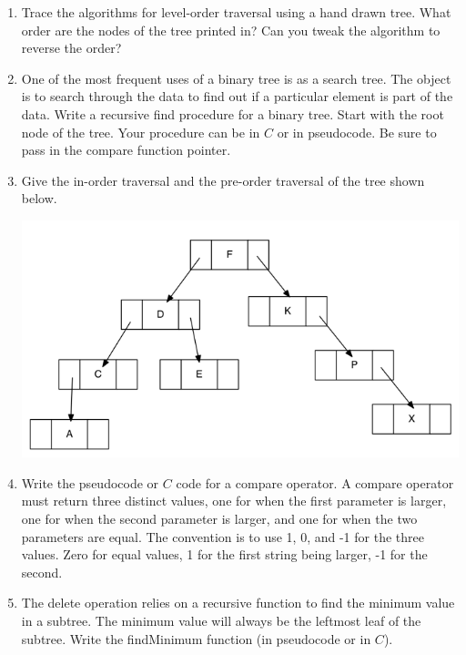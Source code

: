 \documentclass{article}
\begin{document}
\begin{enumerate}
	\vspace{1.5cm}
	\item Trace the algorithms for level-order traversal using a hand drawn tree. What order are the nodes of the tree printed in? Can you tweak the algorithm to reverse the order?
	\vspace{6cm}
	\item One of the most frequent uses of a binary tree is as a search tree. The object is to search through the data to find out if a particular element is part of the data. Write a recursive find procedure for a binary tree. Start with the root node of the tree. Your procedure can be in \(C\) or in pseudocode. Be sure to pass in the compare function pointer.
	\vspace{6cm}
	\item Give the in-order traversal and the pre-order traversal of the tree shown below.
		\begin{center}
			\includegraphics[scale=0.5]{alphatree}
		\end{center}
	\vspace{2cm}
	\item Write the pseudocode or \(C\) code for a compare operator. A compare operator must return three distinct values, one for when the first parameter is larger, one for when the second parameter is larger, and one for when the two parameters are equal. The convention is to use 1, 0, and -1 for the three values. Zero for equal values, 1 for the first string being larger, -1 for the second.
	\vspace{5cm}
	\item The delete operation relies on a recursive function to find the minimum value in a subtree. The minimum value will always be the leftmost leaf of the subtree. Write the findMinimum function (in pseudocode or in \(C\)).
	\vspace{5cm}
	\newpage
\end{enumerate}
\end{document}
